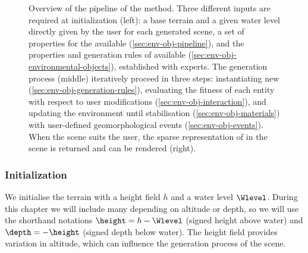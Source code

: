 \begin{figure}[H]
    \caption{Overview of the pipeline of the method. Three different inputs are required at initialization (left): a base terrain and a given water level directly given by the user for each generated scene, a set of properties for the  available (\cref{sec:env-obj-pipeline}), and the properties and generation rules of  available (\cref{sec:env-obj-environmental-objects}), established with experts. The generation process (middle) iteratively proceed in three steps: instantiating new  (\cref{sec:env-obj-generation-rules}), evaluating the fitness of each entity with respect to user modifications (\cref{sec:env-obj-interaction}), and updating the environment until stabilisation (\cref{sec:env-obj-materials}) with user-defined geomorphological events (\cref{sec:env-obj-events}). When the scene suits the user, the sparse representation of  in the scene is returned and can be rendered (right). }
    \label{fig:env-obj-pipeline}
\end{figure}

\subsubsection{Initialization}

We initialise the terrain with a height field $h$ and a water level $\Wlevel$. During this chapter we will include many  depending on altitude or depth, so we will use the shorthand notations $\height = h-\Wlevel$ (signed height above water) and $\depth=-\height$ (signed depth below water). The height field provides variation in altitude, which can influence the generation process of the scene.

